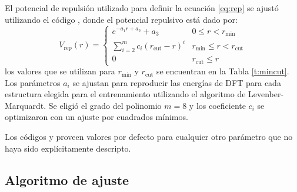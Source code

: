 El potencial de repulsión utilizado para definir la ecuación \ref{eq:rep} 
se ajustó utilizando el código  \cite{tango}, donde el potencial 
repulsivo está dado por:
\begin{equation}\label{eq:v_rep}
    V_{\text{rep}}(r) = \begin{cases}
        e^{-a_1r+a_2}+a_3 & 0\le r<r_{\min}\\
        \displaystyle\sum_{i=2}^m c_i\left(r_{\text{cut}}-r\right)^i & r_{\min}\le r < r_{\text{cut}}\\
        0 & r_{\text{cut}} \le r
    \end{cases}
\end{equation}
los valores que se utilizan para $r_{\min}$ y $r_{\text{cut}}$ se encuentran
en la Tabla \ref{t:mincut}. Los parámetros $a_i$ se ajustan para reproducir las 
energías de DFT para cada estructura elegida para el entrenamiento utilizando el 
algoritmo de Levenber-Marquardt. Se eligió el grado del polinomio $m = 8$ y 
los coeficiente $c_i$ se optimizaron con un ajuste por cuadrados mínimos.

\begin{table}[h!]
    \centering
    \caption{Valores de $r_{\min}$ y $r_{\text{cut}}$ utilizados en la ecuación
    \ref{eq:v_rep}}
    \setlength\extrarowheight{2pt}
    \label{t:mincut}
\end{table}

Los códigos  y  proveen valores por defecto para 
cualquier otro parámetro que no haya sido explícitamente descripto. 


\subsection{Algoritmo de ajuste}\label{s:algfit}

